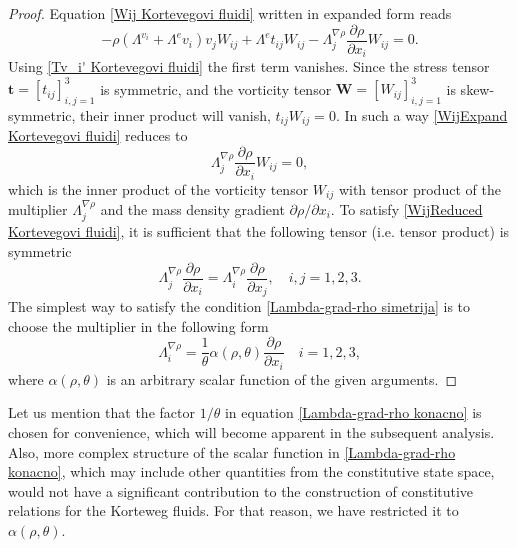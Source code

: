 \documentclass[a4paper,fleqn]{cas-sc}
\theoremstyle{definition}
\begin{document}
\begin{proof}
	Equation \eqref{Wij Kortevegovi fluidi} written in expanded form reads 
	\begin{equation} \label{WijExpand Kortevegovi fluidi}
		- \rho \left( \Lambda^{v_i} + \Lambda^e v_i \right) v_j W_{ij} + 
		\Lambda^e t_{ij} W_{ij} 
		- \Lambda^{\nabla\rho}_j \dfrac{\partial\rho}{\partial x_i} W_{ij} = 0.
	\end{equation} 
	Using \eqref{Tv_i' Kortevegovi fluidi} the first term vanishes. Since the stress tensor $\mathbf{t}={[t_{ij}]}_{i,j=1}^{3}$ is symmetric, and the vorticity tensor ${\mathbf{W}=[W_{ij}]}_{i,j=1}^{3}$ is skew-symmetric, their inner product will vanish, $t_{ij}W_{ij}=0$. In such a way \eqref{WijExpand Kortevegovi fluidi} reduces to 
	\begin{equation} \label{WijReduced Kortevegovi fluidi}
		\Lambda^{\nabla\rho}_j\dfrac{\partial\rho}{\partial x_i}W_{ij}=0, 
	\end{equation}
	which is the inner product of the vorticity tensor $W_{ij}$ with tensor product of the multiplier $\Lambda^{\nabla\rho}_j$ and the mass density gradient $\partial \rho/\partial x_{i}$. To satisfy \eqref{WijReduced Kortevegovi fluidi}, it is sufficient that the following tensor (i.e. tensor product) is symmetric
\begin{equation} \label{Lambda-grad-rho simetrija}
	\Lambda^{\nabla\rho}_j\dfrac{\partial\rho}{\partial x_i} 
	= \Lambda^{\nabla\rho}_i\dfrac{\partial\rho}{\partial x_j}, 
	\quad i,j = 1,2,3. 
\end{equation}
The simplest way to satisfy the condition \eqref{Lambda-grad-rho simetrija} is to choose the multiplier in the following form
\begin{equation} \label{Lambda-grad-rho konacno}
	\Lambda^{\nabla\rho}_i = \dfrac{1}{\theta} \alpha(\rho, \theta) 
	\dfrac{\partial\rho}{\partial x_i}
	\quad i = 1,2,3,
\end{equation} 
where $\alpha(\rho,\theta)$ is an arbitrary scalar function of the given arguments.
\end{proof}

Let us mention that the factor $1/\theta$ in equation \eqref{Lambda-grad-rho konacno} is chosen for convenience, which will become apparent in the subsequent analysis. Also, more complex structure of the scalar function in \eqref{Lambda-grad-rho konacno}, which may include other quantities from the constitutive state space, would not have a significant contribution to the construction of constitutive relations for the Korteweg fluids. For that reason, we have restricted it to $\alpha(\rho,\theta)$. 
\end{document}
